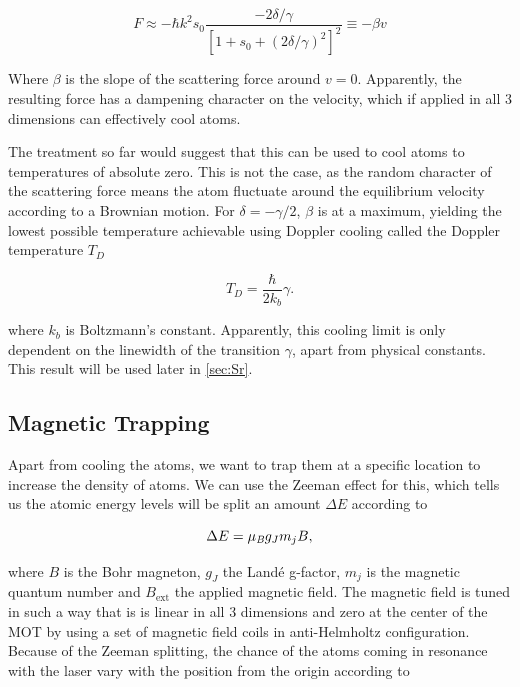\begin{equation}\label{eq:linearize}
	F \approx - \hbar k^2 s_0 \frac{-2\delta/\gamma}{\left[1+s_0+(2\delta/\gamma)^2\right]^2} \equiv -\beta v
\end{equation}

Where $\beta$ is the slope of the scattering force around $v=0$. Apparently, the resulting force has a dampening character on the velocity, which if applied in all 3 dimensions can effectively cool atoms. 

The treatment so far would suggest that this can be used to cool atoms to temperatures of absolute zero. This is not the case, as the random character of the scattering force means the atom fluctuate around the equilibrium velocity according to a Brownian motion. For $\delta=-\gamma/2$, $\beta$ is at a maximum, yielding the lowest possible temperature achievable using Doppler cooling called the Doppler temperature $T_D$

\begin{equation}\label{eq:DopplerTemperature}
	T_D = \frac{\hbar}{2k_b} \gamma.
\end{equation}

where $k_b$ is Boltzmann's constant. Apparently, this cooling limit is only dependent on the linewidth of the transition $\gamma$, apart from physical constants. This result will be used later in \cref{sec:Sr}.

\subsection{Magnetic Trapping}

Apart from cooling the atoms, we want to trap them at a specific location to increase the density of atoms. We can use the Zeeman effect for this, which tells us the atomic energy levels will be split an amount $\Delta E$ according to \cite{Griffiths2004}

\begin{equation}\label{eq:Zeeman}
	\Delta E = \mu_{\emph{B}} g_J m_j B,
\end{equation}

where $B$ is the Bohr magneton, $g_J$ the Landé g-factor, $m_j$ is the magnetic quantum number and $B_{\text{ext}}$ the applied magnetic field. The magnetic field is tuned in such a way that is is linear in all 3 dimensions and zero at the center of the \ac{MOT} by using a set of magnetic field coils in anti-Helmholtz configuration. Because of the Zeeman splitting, the chance of the atoms coming in resonance with the laser vary with the position from the origin according to 

